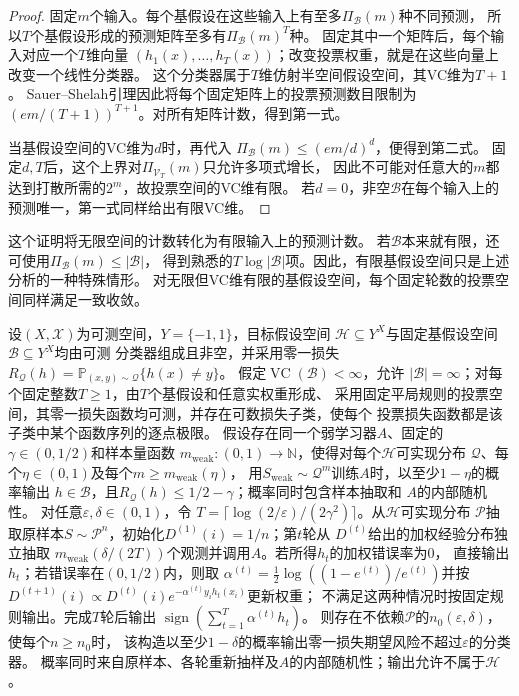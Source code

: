 \begin{proof}
固定$m$个输入。每个基假设在这些输入上有至多$\Pi_{\mathcal B}(m)$种不同预测，
所以$T$个基假设形成的预测矩阵至多有$\Pi_{\mathcal B}(m)^T$种。
固定其中一个矩阵后，每个输入对应一个$T$维向量
$(h_1(x),\ldots,h_T(x))$；改变投票权重，就是在这些向量上改变一个线性分类器。
这个分类器属于$T$维仿射半空间假设空间，其VC维为$T+1$。
Sauer--Shelah引理因此将每个固定矩阵上的投票预测数目限制为
$(em/(T+1))^{T+1}$。对所有矩阵计数，得到第一式。

当基假设空间的VC维为$d$时，再代入
$\Pi_{\mathcal B}(m)\leq(em/d)^d$，便得到第二式。
固定$d,T$后，这个上界对$\Pi_{\mathcal V_T}(m)$只允许多项式增长，
因此不可能对任意大的$m$都达到打散所需的$2^m$，故投票空间的VC维有限。
若$d=0$，非空$\mathcal B$在每个输入上的预测唯一，第一式同样给出有限VC维。
\end{proof}

这个证明将无限空间的计数转化为有限输入上的预测计数。
若$\mathcal B$本来就有限，还可使用$\Pi_{\mathcal B}(m)\leq|\mathcal B|$，
得到熟悉的$T\log|\mathcal B|$项。因此，有限基假设空间只是上述分析的一种特殊情形。
对无限但VC维有限的基假设空间，每个固定轮数的投票空间同样满足一致收敛。

\begin{theorem}[有限VC维基假设空间下的弱学习提升]
\label{thm:finite-class-boosting}
\label{thm:finite-vc-boosting}
设$(X,\mathcal X)$为可测空间，$Y=\{-1,1\}$，目标假设空间
$\mathcal H\subseteq Y^X$与固定基假设空间$\mathcal B\subseteq Y^X$均由可测
分类器组成且非空，并采用零一损失
$R_{\mathcal Q}(h)=\mathbb P_{(x,y)\sim\mathcal Q}\{h(x)\neq y\}$。
假定$\operatorname{VC}(\mathcal B)<\infty$，允许
$|\mathcal B|=\infty$；对每个固定整数$T\geq1$，由$T$个基假设和任意实权重形成、
采用固定平局规则的投票空间，其零一损失函数均可测，并存在可数损失子类，使每个
投票损失函数都是该子类中某个函数序列的逐点极限。
假设存在同一个弱学习器$A$、固定的$\gamma\in(0,1/2)$和样本量函数
$m_{\mathrm{weak}}:(0,1)\to\mathbb N$，使得对每个$\mathcal H$可实现分布
$\mathcal Q$、每个$\eta\in(0,1)$及每个$m\geq m_{\mathrm{weak}}(\eta)$，
用$S_{\mathrm{weak}}\sim\mathcal Q^m$训练$A$时，以至少$1-\eta$的概率输出
$h\in\mathcal B$，且$R_{\mathcal Q}(h)\leq1/2-\gamma$；概率同时包含样本抽取和
$A$的内部随机性。
对任意$\varepsilon,\delta\in(0,1)$，令
$T=\lceil\log(2/\varepsilon)/(2\gamma^2)\rceil$。从$\mathcal H$可实现分布
$\mathcal P$抽取原样本$S\sim\mathcal P^n$，初始化$D^{(1)}(i)=1/n$；第$t$轮从
$D^{(t)}$给出的加权经验分布独立抽取
$m_{\mathrm{weak}}(\delta/(2T))$个观测并调用$A$。若所得$h_t$的加权错误率为0，
直接输出$h_t$；若错误率在$(0,1/2)$内，则取
$\alpha^{(t)}=\tfrac12\log((1-e^{(t)})/e^{(t)})$并按
$D^{(t+1)}(i)\propto D^{(t)}(i)e^{-\alpha^{(t)}y_i h_t(x_i)}$更新权重；
不满足这两种情况时按固定规则输出。完成$T$轮后输出
$\operatorname{sign}(\sum_{t=1}^T\alpha^{(t)}h_t)$。
则存在不依赖$\mathcal P$的$n_0(\varepsilon,\delta)$，使每个$n\geq n_0$时，
该构造以至少$1-\delta$的概率输出零一损失期望风险不超过$\varepsilon$的分类器。
概率同时来自原样本、各轮重新抽样及$A$的内部随机性；输出允许不属于$\mathcal H$。
\end{theorem}

